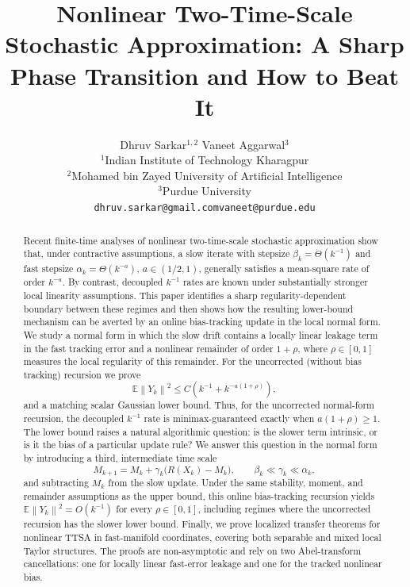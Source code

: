 \documentclass{article}
\title{Nonlinear Two-Time-Scale Stochastic Approximation: A Sharp Phase Transition and How to Beat It}
\author{Dhruv Sarkar$^{1,2}$  \quad Vaneet Aggarwal$^3$\\
$^1$Indian Institute of Technology Kharagpur\\
$^2$Mohamed bin Zayed University of Artificial Intelligence\\
$^3$Purdue University\\
\texttt{dhruv.sarkar@gmail.com}\quad  \texttt{vaneet@purdue.edu}}
\newcommand{\E}{\mathbb{E}}
\newcommand{\norm}[1]{\left\lVert #1\right\rVert}
\begin{document}
\maketitle

\begin{abstract}
Recent finite-time analyses of nonlinear two-time-scale stochastic approximation show that, under contractive assumptions, a slow iterate with stepsize $\beta_k=\Theta(k^{-1})$ and fast stepsize $\alpha_k=\Theta(k^{-a})$, $a\in(1/2,1)$, generally satisfies a mean-square rate of order $k^{-a}$. By contrast, decoupled $k^{-1}$ rates are known under substantially stronger local linearity assumptions. This paper identifies a sharp regularity-dependent boundary between these regimes and then shows how the resulting lower-bound mechanism can be averted by an online bias-tracking update in the local normal form. We study a normal form in which the slow drift contains a locally linear leakage term in the fast tracking error and a nonlinear remainder of order $1+\rho$, where $\rho\in[0,1]$ measures the local regularity of this remainder. For the uncorrected (without bias tracking) recursion we prove
\[
  \E\norm{Y_k}^2
  \le
  C\left(k^{-1}+k^{-a(1+\rho)}\right),
\]
and a matching scalar Gaussian lower bound. Thus, for the uncorrected normal-form recursion, the decoupled $k^{-1}$ rate is minimax-guaranteed exactly when $a(1+\rho)\ge1$. The lower bound raises a natural algorithmic question: is the slower term intrinsic, or is it the bias of a particular update rule? We answer this question in the normal form by introducing a third, intermediate time scale
\[
  M_{k+1}=M_k+\gamma_k\big(R(X_k)-M_k\big),
  \qquad \beta_k\ll\gamma_k\ll\alpha_k,
\]
and subtracting $M_k$ from the slow update. Under the same stability, moment, and remainder assumptions as the upper bound, this online bias-tracking recursion yields $\E\norm{Y_k}^2=O(k^{-1})$ for every $\rho\in[0,1]$, including regimes where the uncorrected recursion has the slower lower bound. Finally, we prove localized transfer theorems for nonlinear TTSA in fast-manifold coordinates, covering both separable and mixed local Taylor structures. The proofs are non-asymptotic and rely on two Abel-transform cancellations: one for locally linear fast-error leakage and one for the tracked nonlinear bias.
\end{abstract}
\fi 
\end{document}
